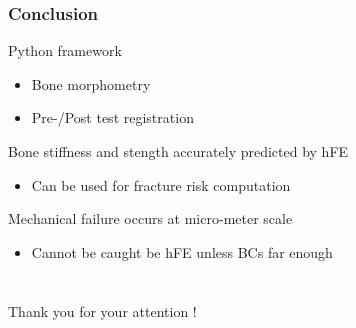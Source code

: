 \documentclass[xcolor=table,11pt]{beamer}
\begin{document}
	\begin{frame}
		\frametitle{Conclusion}
		Python framework
		\begin{itemize}
			\item Bone morphometry
			\item Pre-/Post test registration
		\end{itemize}

		\vspace{5mm}

		Bone stiffness and stength accurately predicted by hFE
		\begin{itemize}
			\item Can be used for fracture risk computation
		\end{itemize}
		
		\vspace{5mm}

		Mechanical failure occurs at micro-meter scale
		\begin{itemize}
			\item Cannot be caught be hFE unless BCs far enough
		\end{itemize}

	\end{frame}
	
	
	\section{}
	\begin{frame}
		\centering
		\vfill
		Thank you for your attention !\\
		\vfill
	\end{frame}
	
	
	\appendix
	
\end{document}
